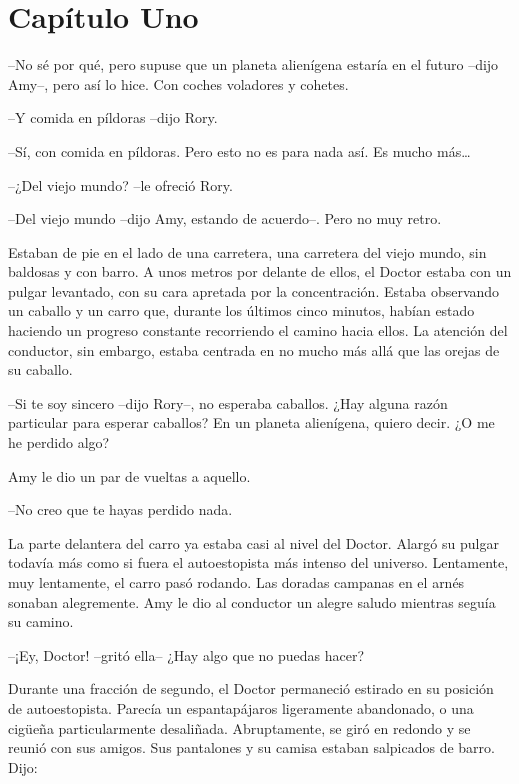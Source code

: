 \chapter*{Capítulo Uno}

{--No sé por qué, pero supuse que un planeta alienígena estaría en
	el futuro --dijo Amy--, pero así lo hice. Con coches voladores y
cohetes.}

{--Y comida en píldoras --dijo Rory.}

{--Sí, con comida en píldoras. Pero esto no es para nada así. Es mucho
	más\ldots{}}

{--¿Del viejo mundo? --le ofreció Rory.}

{--Del viejo mundo --dijo Amy, estando de acuerdo--. Pero no muy
retro.}

{Estaban de pie en el lado de una carretera, una carretera del viejo
	mundo, sin baldosas y con barro. A unos metros por delante de ellos, el
	Doctor estaba con un pulgar levantado, con su cara apretada por la
	concentración. Estaba observando un caballo y un carro que, durante los
	últimos cinco minutos, habían estado haciendo un progreso constante
	recorriendo el camino hacia ellos. La atención del conductor, sin
	embargo, estaba centrada en no mucho más allá que las orejas de su
caballo.}

{--Si te soy sincero --dijo Rory--, no esperaba caballos. ¿Hay alguna
	razón particular para esperar caballos? En un planeta alienígena, quiero
decir. ¿O me he perdido algo?}

{Amy le dio un par de vueltas a aquello.}

{--No creo que te hayas perdido nada.}

{La parte delantera del carro ya estaba casi al nivel del Doctor. Alargó
	su pulgar todavía más como si fuera el autoestopista más intenso del
	universo. Lentamente, muy lentamente, el carro pasó rodando. Las doradas
	campanas en el arnés sonaban alegremente. Amy le dio al conductor un
alegre saludo mientras seguía su camino.}

{--¡Ey, Doctor! --gritó ella-- ¿Hay algo que no puedas hacer?}

{Durante una fracción de segundo, el Doctor permaneció estirado en su
	posición de autoestopista. Parecía un espantapájaros ligeramente
	abandonado, o una cigüeña particularmente desaliñada. Abruptamente, se
	giró en redondo y se reunió con sus amigos. Sus pantalones y su camisa
estaban salpicados de barro. Dijo:}

